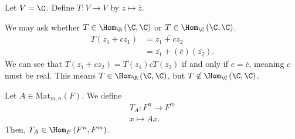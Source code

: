 \documentclass[10pt]{mypackage}
\begin{document}
\begin{example}
  Let $V = \C$. Define $T: V\rightarrow V$ by $z\mapsto \overline{z}$.\newline

  We may ask whether $T\in \Hom_{\R}\left(\C,\C\right)$ or $T\in \Hom_{\C}\left(\C,\C\right)$.
  \begin{align*}
    T\left(z_1 + cz_1\right) &= \overline{z_1 + cz_2}\\
                             &= \overline{z_1} + \left(\overline{c} \right)\left(\overline{z_2}\right).
  \end{align*}
  We can see that $T\left(z_1 + cz_2\right) = T\left(z_1\right) cT\left(z_2\right)$ if and only if $c = \overline{c}$, meaning $c$ must be real. This means $T\in \Hom_{\R}\left(\C,\C\right)$, but $T\notin \Hom_{\C}\left(\C,\C\right)$.
\end{example}
\begin{example}[Matrices]
  Let $A \in \text{Mat}_{m,n}\left(F\right)$. We define
  \begin{align*}
    T_{A}: F^n \rightarrow F^m\\
    x \mapsto Ax.
  \end{align*}
  Then, $T_A \in \Hom_{F}\left(F^n,F^m\right)$.
\end{example}
\end{document}
